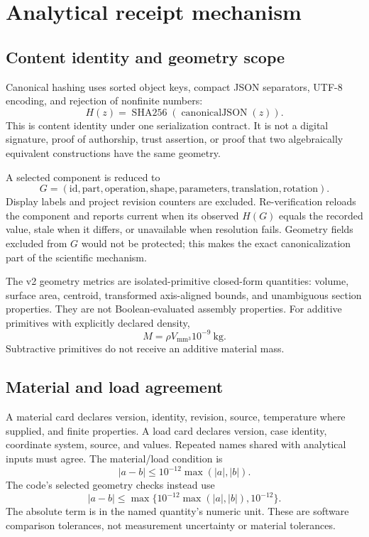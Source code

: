 \documentclass[10pt]{article}
\newcommand{\Hsh}{\operatorname{SHA256}}
\newcommand{\canon}{\operatorname{canonicalJSON}}
\begin{document}
\section{Analytical receipt mechanism}

\subsection{Content identity and geometry scope}

Canonical hashing uses sorted object keys, compact JSON separators, UTF-8
encoding, and rejection of nonfinite numbers:
\begin{equation}
 H(z)=\Hsh(\canon(z)).
\end{equation}
This is content identity under one serialization contract. It is not a digital
signature, proof of authorship, trust assertion, or proof that two algebraically
equivalent constructions have the same geometry.

A selected component is reduced to
\begin{equation}
 G=(\mathrm{id},\mathrm{part},\mathrm{operation},\mathrm{shape},
       \mathrm{parameters},\mathrm{translation},\mathrm{rotation}).
\end{equation}
Display labels and project revision counters are excluded. Re-verification
reloads the component and reports current when its observed \(H(G)\) equals
the recorded value, stale when it differs, or unavailable when resolution
fails. Geometry fields excluded from \(G\) would not be protected; this makes
the exact canonicalization part of the scientific mechanism.

The v2 geometry metrics are isolated-primitive closed-form quantities:
volume, surface area, centroid, transformed axis-aligned bounds, and
unambiguous section properties. They are not Boolean-evaluated assembly
properties. For additive primitives with explicitly declared density,
\begin{equation}
M=\rho V_{\mathrm{mm^3}}10^{-9}\ \mathrm{kg}.
\end{equation}
Subtractive primitives do not receive an additive material mass.

\subsection{Material and load agreement}

A material card declares version, identity, revision, source, temperature
where supplied, and finite properties. A load card declares version, case
identity, coordinate system, source, and values. Repeated names shared with
analytical inputs must agree. The material/load condition is
\begin{equation}
 |a-b|\le 10^{-12}\max(|a|,|b|).
\end{equation}
The code's selected geometry checks instead use
\begin{equation}
 |a-b|\le \max\{10^{-12}\max(|a|,|b|),10^{-12}\}.
\label{eq:geometrytol}
\end{equation}
The absolute term is in the named quantity's numeric unit. These are software
comparison tolerances, not measurement uncertainty or material tolerances.
\end{document}
